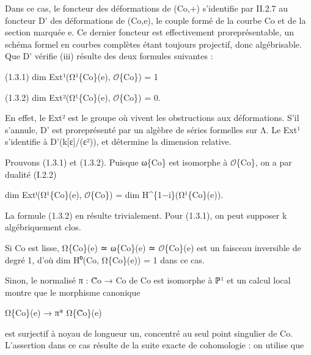 \documentclass[11pt,a4paper]{article}
\begin{document}
Dans ce cas, le foncteur des déformations de (C\textunderscore{}o,+) s'identifie par II.2.7 au foncteur D' des déformations de (C\textunderscore{}o,e), le couple formé de la courbe C\textunderscore{}o et de la section marquée e. Ce dernier foncteur est effectivement proreprésentable, un schéma formel en courbes complètes étant toujours projectif, donc algébrisable. Que D' vérifie (iii) résulte des deux formules suivantes :

(1.3.1)        dim Ext¹(Ω¹\textunderscore{}\{C\textunderscore{}o\}(e), \ensuremath{\mathcal{O}}\textunderscore{}\{C\textunderscore{}o\}) = 1

(1.3.2)        dim Ext²(Ω¹\textunderscore{}\{C\textunderscore{}o\}(e), \ensuremath{\mathcal{O}}\textunderscore{}\{C\textunderscore{}o\}) = 0.

En effet, le Ext² est le groupe où vivent les obstructions aux déformations. S'il s'annule, D' est proreprésenté par un algèbre de séries formelles sur Λ. Le Ext¹ s'identifie à D'(k[ε]/(ε²)), et détermine la dimension relative.

Prouvons (1.3.1) et (1.3.2). Puisque ω\textunderscore{}\{C\textunderscore{}o\} est isomorphe à \ensuremath{\mathcal{O}}\textunderscore{}\{C\textunderscore{}o\}, on a par dualité (I.2.2)

dim Extⁱ(Ω¹\textunderscore{}\{C\textunderscore{}o\}(e), \ensuremath{\mathcal{O}}\textunderscore{}\{C\textunderscore{}o\}) = dim H\textasciicircum{}\{1−i\}(Ω¹\textunderscore{}\{C\textunderscore{}o\}(e)).

La formule (1.3.2) en résulte trivialement. Pour (1.3.1), on peut supposer k algébriquement clos.

Si C\textunderscore{}o est lisse, Ω\textunderscore{}\{C\textunderscore{}o\}(e) ≃ ω\textunderscore{}\{C\textunderscore{}o\}(e) ≃ \ensuremath{\mathcal{O}}\textunderscore{}\{C\textunderscore{}o\}(e) est un faisceau inversible de degré 1, d'où dim H⁰(C\textunderscore{}o, Ω\textunderscore{}\{C\textunderscore{}o\}(e)) = 1 dans ce cas.

Sinon, le normalisé π : C̃\textunderscore{}o → C\textunderscore{}o de C\textunderscore{}o est isomorphe à ℙ¹ et un calcul local montre que le morphisme canonique

Ω\textunderscore{}\{C\textunderscore{}o\}(e) → π\textunderscore{}* Ω\textunderscore{}\{C̃\textunderscore{}o\}(e)

est surjectif à noyau de longueur un, concentré au seul point singulier de C\textunderscore{}o. L'assertion dans ce cas résulte de la suite exacte de cohomologie : on utilise que
\end{document}
